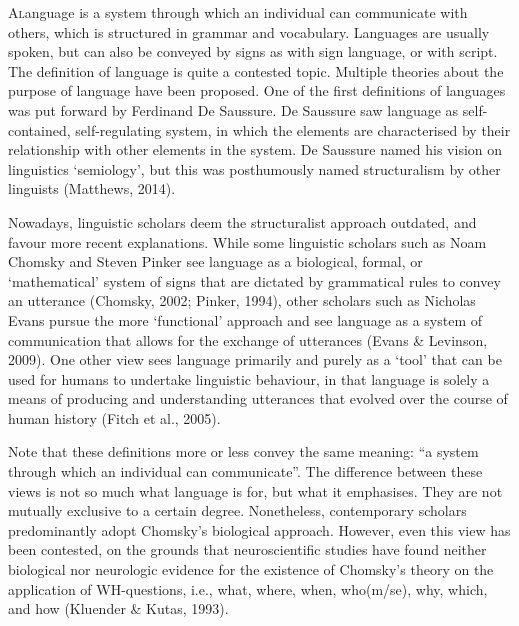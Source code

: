 \def\isy#1{\scalerel*{\texttt{[image: ./Images/\#1.jpg]}}{X}}


\lettrine{A} language is a system through which an individual can communicate with others, which is structured in grammar and vocabulary. Languages are usually spoken, but can also be conveyed by signs as with sign language, or with script. The definition of language is quite a contested topic. Multiple theories about the purpose of language have been proposed. One of the first definitions of languages was put forward by Ferdinand De Saussure. De Saussure saw language as self-contained, self-regulating system, in which the elements are characterised by their relationship with other elements in the system. De Saussure named his vision on linguistics ‘semiology’, but this was posthumously named structuralism by other linguists (Matthews, 2014). 

Nowadays, linguistic scholars deem the structuralist approach outdated, and favour more recent explanations. While some linguistic scholars such as Noam Chomsky and Steven Pinker see language as a biological, formal, or ‘mathematical’ system of signs that are dictated by grammatical rules to convey an utterance (Chomsky, 2002; Pinker, 1994), other scholars such as Nicholas Evans pursue the more ‘functional’ approach and see language as a system of communication that allows for the exchange of utterances (Evans \& Levinson, 2009). One other view sees language primarily and purely as a ‘tool’ that can be used for humans to undertake linguistic behaviour, in that language is solely a means of producing and understanding utterances that evolved over the course of human history (Fitch et al., 2005). 

Note that these definitions more or less convey the same meaning: “a system through which an individual can communicate”. The difference between these views is not so much what language is for, but what it emphasises. They are not mutually exclusive to a certain degree. Nonetheless, contemporary scholars predominantly adopt Chomsky's biological approach. However, even this view has been contested, on the grounds that neuroscientific studies have found neither biological nor neurologic evidence for the existence of Chomsky’s theory on the application of WH-questions, i.e., what, where, when, who(m/se), why, which, and how (Kluender \& Kutas, 1993). 

